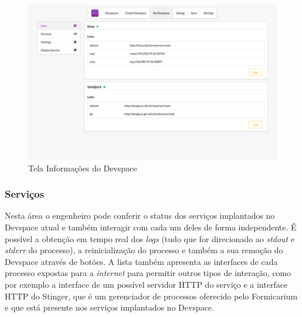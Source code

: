     \begin{figure}[htb]
    	\caption{\label{fig_frontend_devspace_info}Tela Informações do Devspace}
    	\begin{center}
    	\includegraphics[width=\textwidth,keepaspectratio]{pictures/frontend/frontend-devspace-info.png}
    	\end{center}
    \end{figure}
    
    \subsubsection{Serviços}
    
    Nesta área o engenheiro pode conferir o status dos serviços implantados no Devspace atual e também interagir com cada um deles de forma independente. É possível a obtenção em tempo real dos \textit{logs} (tudo que for direcionado ao \textit{stdout} e \textit{stderr} do processo), a reinicialização do processo e também a sua remoção do Devspace através de botões. A lista também apresenta as interfaces de cada processo expostas para a \textit{internet} para permitir outros tipos de interação, como por exemplo a interface de um possível servidor HTTP do serviço e a interface HTTP do Stinger, que é um gerenciador de processos oferecido pelo Formicarium e que está presente nos serviços implantados no Devspace.
    
